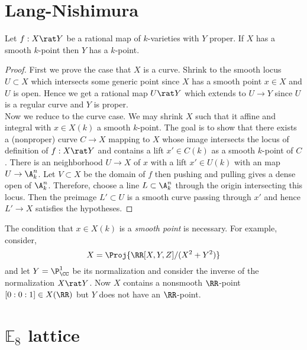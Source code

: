 \documentclass[12pt]{article}
\begin{document}
\tableofcontents

\section{Lang-Nishimura}

\begin{theorem}
Let $f : X \rat Y$  be a rational map of $k$-varieties with $Y$ proper. If $X$ has a smooth $k$-point then $Y$ has a $k$-point.
\end{theorem}

\begin{proof}
First we prove the case that $X$ is a curve. Shrink to the smooth locus $U \subset X$ which intersects some generic point since $X$ has a smooth point $x \in X$ and $U$ is open. Hence we get a rational map $U \rat Y$ which extends to $U \to Y$ since $U$ is a regular curve and $Y$ is proper. 
\bigskip\\
Now we reduce to the curve case. We may shrink $X$ such that it affine and integral with $x \in X(k)$ a smooth $k$-point. The goal is to show that there exists a (nonproper) curve $C \to X$ mapping to $X$ whose image intersects the locus of definition of $f : X \rat Y$ and contains a lift $x' \in C(k)$ as a smooth $k$-point of $C$. There is an \etale neighborhood $U \to X$ of $x$ with a lift $x' \in U(k)$ with an \etale map $U \to \A^n_k$. Let $V \subset X$ be the domain of $f$ then pushing and pulling gives a dense open of $\A^n_k$. Therefore, choose a line $L \subset \A^n_k$ through the origin intersecting this locus. Then the preimage $L' \subset U$ is a smooth curve passing through $x'$ and hence $L' \to X$ satisfies the hypotheses. 
\end{proof}

\begin{example}
The condition that $x \in X(k)$ is a \textit{smooth point} is necessary. For example, consider,
\[ X = \Proj{\RR[X,Y,Z]/(X^2 + Y^2)} \]
and let $Y = \P^1_{\CC}$ be its normalization and consider the inverse of the normalization $X \rat Y$. Now $X$ contains a nonsmooth $\RR$-point $[0:0:1] \in X(\RR)$ but $Y$ does not have an $\RR$-point. 
\end{example}

\newcommand{\bb}{\mathbb}

\section{$\bb{E}_8$ lattice}
\end{document}
